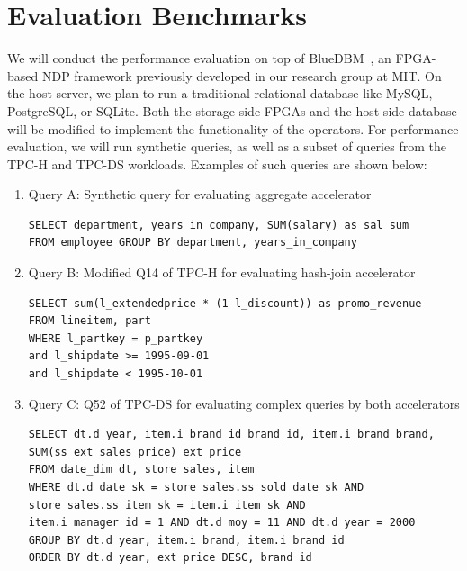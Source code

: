 \documentclass{article}
\begin{document}
\section{Evaluation Benchmarks}
\label{sec:eval}

We will conduct the performance evaluation on top of BlueDBM~\cite{bluedbm}, an FPGA-based NDP framework previously developed in our research group at MIT. On the host server, we plan to run a traditional relational database like MySQL, PostgreSQL, or SQLite. Both the storage-side FPGAs and the host-side database will be modified to implement the functionality of the operators. For performance evaluation, we will run synthetic queries, as well as a subset of queries from the TPC-H and TPC-DS workloads. Examples of such queries are shown below:


\begin{enumerate}

\item Query A: Synthetic query for evaluating aggregate accelerator 
\begin{verbatim}
SELECT department, years in company, SUM(salary) as sal sum
FROM employee GROUP BY department, years_in_company
\end{verbatim}

\item Query B: Modified Q14 of TPC-H for evaluating hash-join accelerator
\begin{verbatim}
SELECT sum(l_extendedprice * (1-l_discount)) as promo_revenue
FROM lineitem, part
WHERE l_partkey = p_partkey
and l_shipdate >= 1995-09-01 
and l_shipdate < 1995-10-01
\end{verbatim}

\item Query C: Q52 of TPC-DS for evaluating complex queries by both accelerators
\begin{verbatim}
SELECT dt.d_year, item.i_brand_id brand_id, item.i_brand brand,
SUM(ss_ext_sales_price) ext_price
FROM date_dim dt, store sales, item
WHERE dt.d date sk = store sales.ss sold date sk AND
store sales.ss item sk = item.i item sk AND
item.i manager id = 1 AND dt.d moy = 11 AND dt.d year = 2000
GROUP BY dt.d year, item.i brand, item.i brand id
ORDER BY dt.d year, ext price DESC, brand id
\end{verbatim}
\end{enumerate}



\end{document}
